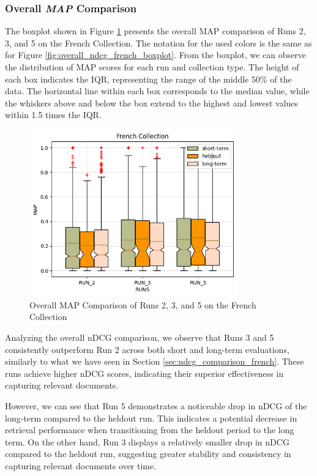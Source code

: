 \subsubsection{Overall \textit{MAP} Comparison}
The boxplot shown in Figure \ref{fig:map_french} presents the overall \ac{MAP} comparison of Runs 2, 3, and 5 on the French Collection.
The notation for the used colors is the same as for Figure \ref{fig:overall_ndcg_french_boxplot}.
From the boxplot, we can observe the distribution of \ac{MAP} scores for each run and collection type. The height of each box indicates the \ac{IQR}, representing the range of the middle 50\% of the data. 
The horizontal line within each box corresponds to the median value, while the whiskers above and below the box extend to the highest and lowest values within 1.5 times the \ac{IQR}.

\begin{figure}[!h]
    \centering
    \includegraphics[width=0.8\textwidth]{figure/StatisticalAnalysis/BoxPlot/MAP French.png}
    \caption{Overall MAP Comparison of Runs 2, 3, and 5 on the French Collection}
    \label{fig:map_french}
\end{figure}

Analyzing the overall \ac{nDCG} comparison, we observe that Runs 3 and 5 consistently outperform Run 2 across both short and long-term evaluations, similarly to what we have seen in Section \ref{sec:ndcg_comparison_french}.
These runs achieve higher \ac{nDCG} scores, indicating their superior effectiveness in capturing relevant documents.  

However, we can see that Run 5 demonstrates a noticeable drop in \ac{nDCG} of the long-term compared to the heldout run. 
This indicates a potential decrease in retrieval performance when transitioning from the heldout period to the long term. 
On the other hand, Run 3 displays a relatively smaller drop in \ac{nDCG} compared to the heldout run, suggesting greater stability and consistency in capturing relevant documents over time.

